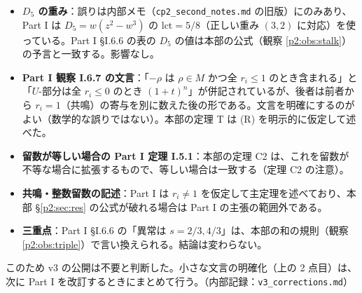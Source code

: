 \begin{itemize}
\item \textbf{$D_5$ の重み}：誤りは内部メモ（\texttt{cp2\_second\_notes.md} の旧版）にのみあり、Part I は $D_5=w(z^2-w^3)$ の $\mathrm{lct}=5/8$（正しい重み $(3,2)$ に対応）を使っている。Part I \S I.6.6 の表の $D_5$ の値は本部の公式（観察 \ref{p2:obs:stalk}）の予言と一致する。影響なし。\tV
\item \textbf{Part I 観察 I.6.7 の文言}：「$-\rho$ は $\rho\in M$ かつ全 $r_i\le1$ のとき含まれる」と「$U$-部分は全 $r_i\le0$ のとき $(1+t)^n$」が併記されているが、後者は前者から $r_i=1$（共鳴）の寄与を別に数えた後の形である。文言を明確にするのがよい（数学的な誤りではない）。本部の定理 T は (R) を明示的に仮定して述べた。
\item \textbf{留数が等しい場合の Part I 定理 I.5.1}：本部の定理 C2 は、これを留数が不等な場合に拡張するもので、等しい場合は一致する（定理 C2 の注意）。
\item \textbf{共鳴・整数留数の記述}：Part I は $r_i\ne1$ を仮定して主定理を述べており、本部 \S\ref{p2:sec:res} の公式が破れる場合は Part I の主張の範囲外である。
\item \textbf{三重点}：Part I \S I.6.6 の「異常は $s=2/3,4/3$」は、本部の和の規則（観察 \ref{p2:obs:triple}）で言い換えられる。結論は変わらない。
\end{itemize}
このため v3 の公開は不要と判断した。小さな文言の明確化（上の 2 点目）は、次に Part I を改訂するときにまとめて行う。（内部記録：\texttt{v3\_corrections.md}）

